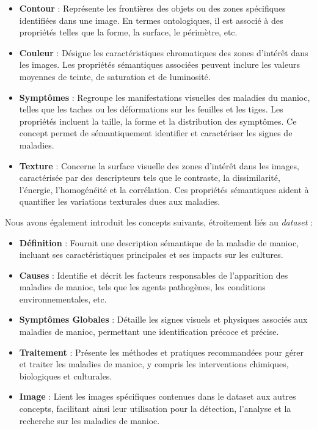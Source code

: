 \begin{itemize}
	\item \textbf{Contour} : Représente les frontières des objets ou des zones spécifiques identifiées dans une image. En termes ontologiques, il est associé à des propriétés telles que la forme, la surface, le périmètre, etc.
	
	\item \textbf{Couleur} : Désigne les caractéristiques chromatiques des zones d'intérêt dans les images. Les propriétés sémantiques associées peuvent inclure les valeurs moyennes de teinte, de saturation et de luminosité.
	
	\item \textbf{Symptômes} : Regroupe les manifestations visuelles des maladies du manioc, telles que les taches ou les déformations sur les feuilles et les tiges. Les propriétés incluent la taille, la forme et la distribution des symptômes. Ce concept permet de sémantiquement identifier et caractériser les signes de maladies.
	
	\item \textbf{Texture} : Concerne la surface visuelle des zones d'intérêt dans les images, caractérisée par des descripteurs tels que le contraste, la dissimilarité, l'énergie, l'homogénéité et la corrélation. Ces propriétés sémantiques aident à quantifier les variations texturales dues aux maladies.
\end{itemize}

Nous avons également introduit les concepts suivants, étroitement liés au \textit{dataset} :

\begin{itemize}
	\item \textbf{Définition} : Fournit une description sémantique de la maladie de manioc, incluant ses caractéristiques principales et ses impacts sur les cultures.
	
	\item \textbf{Causes} : Identifie et décrit les facteurs responsables de l'apparition des maladies de manioc, tels que les agents pathogènes, les conditions environnementales, etc.
	
	\item \textbf{Symptômes Globales} : Détaille les signes visuels et physiques associés aux maladies de manioc, permettant une identification précoce et précise.
	
	\item \textbf{Traitement} : Présente les méthodes et pratiques recommandées pour gérer et traiter les maladies de manioc, y compris les interventions chimiques, biologiques et culturales.
	
	\item \textbf{Image} : Lient les images spécifiques contenues dans le dataset aux autres concepts, facilitant ainsi leur utilisation pour la détection, l'analyse et la recherche sur les maladies de manioc.
\end{itemize}


